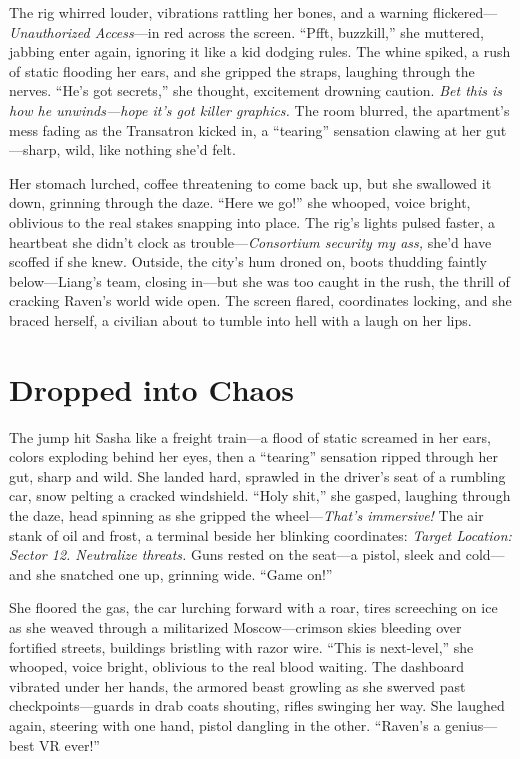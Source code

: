 \documentclass[12pt]{book}
\begin{document}
The rig whirred louder, vibrations rattling her bones, and a warning flickered—\textit{Unauthorized Access}—in red across the screen. “Pfft, buzzkill,” she muttered, jabbing enter again, ignoring it like a kid dodging rules. The whine spiked, a rush of static flooding her ears, and she gripped the straps, laughing through the nerves. “He’s got secrets,” she thought, excitement drowning caution. \textit{Bet this is how he unwinds—hope it’s got killer graphics.} The room blurred, the apartment’s mess fading as the Transatron kicked in, a “tearing” sensation clawing at her gut—sharp, wild, like nothing she’d felt.

Her stomach lurched, coffee threatening to come back up, but she swallowed it down, grinning through the daze. “Here we go!” she whooped, voice bright, oblivious to the real stakes snapping into place. The rig’s lights pulsed faster, a heartbeat she didn’t clock as trouble—\textit{Consortium security my ass,} she’d have scoffed if she knew. Outside, the city’s hum droned on, boots thudding faintly below—Liang’s team, closing in—but she was too caught in the rush, the thrill of cracking Raven’s world wide open. The screen flared, coordinates locking, and she braced herself, a civilian about to tumble into hell with a laugh on her lips.

\section{Dropped into Chaos}

The jump hit Sasha like a freight train—a flood of static screamed in her ears, colors exploding behind her eyes, then a “tearing” sensation ripped through her gut, sharp and wild. She landed hard, sprawled in the driver’s seat of a rumbling car, snow pelting a cracked windshield. “Holy shit,” she gasped, laughing through the daze, head spinning as she gripped the wheel—\textit{That’s immersive!} The air stank of oil and frost, a terminal beside her blinking coordinates: \textit{Target Location: Sector 12. Neutralize threats.} Guns rested on the seat—a pistol, sleek and cold—and she snatched one up, grinning wide. “Game on!”

She floored the gas, the car lurching forward with a roar, tires screeching on ice as she weaved through a militarized Moscow—crimson skies bleeding over fortified streets, buildings bristling with razor wire. “This is next-level,” she whooped, voice bright, oblivious to the real blood waiting. The dashboard vibrated under her hands, the armored beast growling as she swerved past checkpoints—guards in drab coats shouting, rifles swinging her way. She laughed again, steering with one hand, pistol dangling in the other. “Raven’s a genius—best VR ever!”
\end{document}
